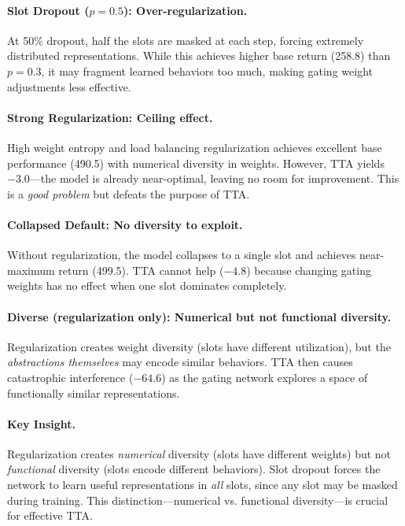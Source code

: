 \documentclass{article}
\begin{document}
\paragraph{Slot Dropout ($p=0.5$): Over-regularization.} At 50\% dropout, half the slots are masked at each step, forcing extremely distributed representations. While this achieves higher base return (258.8) than $p=0.3$, it may fragment learned behaviors too much, making gating weight adjustments less effective.

\paragraph{Strong Regularization: Ceiling effect.} High weight entropy and load balancing regularization achieves excellent base performance (490.5) with numerical diversity in weights. However, TTA yields $-3.0$---the model is already near-optimal, leaving no room for improvement. This is a \emph{good problem} but defeats the purpose of TTA.

\paragraph{Collapsed Default: No diversity to exploit.} Without regularization, the model collapses to a single slot and achieves near-maximum return (499.5). TTA cannot help ($-4.8$) because changing gating weights has no effect when one slot dominates completely.

\paragraph{Diverse (regularization only): Numerical but not functional diversity.} Regularization creates weight diversity (slots have different utilization), but the \emph{abstractions themselves} may encode similar behaviors. TTA then causes catastrophic interference ($-64.6$) as the gating network explores a space of functionally similar representations.

\paragraph{Key Insight.} Regularization creates \emph{numerical} diversity (slots have different weights) but not \emph{functional} diversity (slots encode different behaviors). Slot dropout forces the network to learn useful representations in \emph{all} slots, since any slot may be masked during training. This distinction---numerical vs. functional diversity---is crucial for effective TTA.
\end{document}
